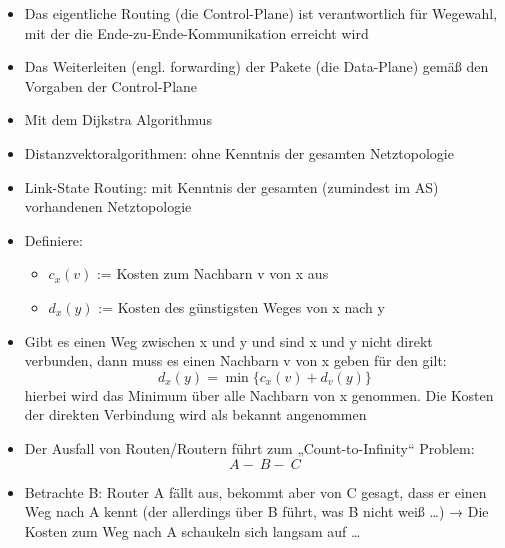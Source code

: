 
\begin{itemize}
    \item Das eigentliche Routing (die Control-Plane) ist verantwortlich für Wegewahl, mit der die Ende-zu-Ende-Kommunikation erreicht wird
    \item Das Weiterleiten (engl. forwarding) der Pakete (die Data-Plane) gemäß den Vorgaben der Control-Plane
\end{itemize}

\begin{itemize}
    \item Mit dem Dijkstra Algorithmus
\end{itemize}

\begin{itemize}
    \item Distanzvektoralgorithmen: ohne Kenntnis der gesamten Netztopologie
    \item Link-State Routing: mit Kenntnis der gesamten (zumindest im AS) vorhandenen Netztopologie
\end{itemize}

\begin{itemize}
    \item Definiere:
    \begin{itemize}
        \item \(c_x(v)\) := Kosten zum Nachbarn v von x aus
        \item \(d_x(y)\) := Kosten des günstigsten Weges von x nach y
    \end{itemize}
    \item Gibt es einen Weg zwischen x und y und sind x und y nicht direkt verbunden, dann muss es einen Nachbarn v von x geben für den gilt:
    \[d_x(y) = \min \{c_x(v) + d_v(y) \}\]
    hierbei wird das Minimum über alle Nachbarn von x genommen.
    Die Kosten der direkten Verbindung wird als bekannt angenommen
\end{itemize}

\begin{itemize}
    \item Der Ausfall von Routen/Routern führt zum „Count-to-Infinity“ Problem: \[A -\: B -\: C\]
    \item Betrachte B: Router A fällt aus, bekommt aber von C gesagt, dass er einen Weg nach A kennt (der allerdings über B führt, was B nicht weiß \ldots)
    → Die Kosten zum Weg nach A schaukeln sich langsam auf \ldots
\end{itemize}

